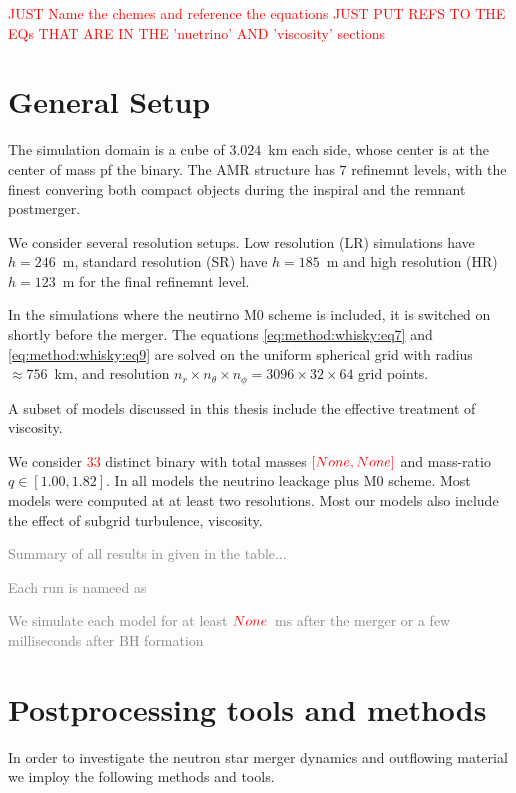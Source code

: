 \documentclass[11pt,a4paper,headinclude=true,DIV=14,BCOR=8mm,chapterprefix,listof=totoc,twoside,openright,abstracton]{scrbook}
\newcommand{\red}[1]{\textcolor{red}{#1}}
\newcommand{\gray}[1]{\textcolor{gray}{#1}}
\begin{document}
\red{JUST Name the chemes and reference the equations}
\red{JUST PUT REFS TO THE EQs THAT ARE IN THE 'nuetrino' AND 'viscosity' sections}


\section{General Setup}



The simulation domain is a cube of $3.024$~km each side, whose center is at the center of mass pf the binary.
The AMR structure has $7$ refinemnt levels, with the finest convering both compact objects during the inspiral and the remnant postmerger.

We consider several resolution setups. Low resolution (LR) simulations have $h=246$~m, standard resolution (SR) 
have $h=185$~m and high resolution (HR) $h=123$~m for the final refinemnt level.

In the simulations where the neutirno M0 scheme is included, it is switched on shortly before the merger. 
The equations \eqref{eq:method:whisky:eq7} and \eqref{eq:method:whisky:eq9} are solved on the uniform spherical grid
with radius $\approx 756$~km, and resolution $n_r\times n_{\theta}\times n_{\phi} = 3096 \times 32 \times 64$
grid points.

A subset of models discussed in this thesis include the effective treatment of viscosity. 

We consider \red{$33$} distinct binary with total masses $\red{[None,None]}$ and mass-ratio $q\in[1.00,1.82]$.
In all models the neutrino leackage plus M0 scheme. Most models were computed at at least two resolutions. 
Most our models also include the effect of subgrid turbulence, viscosity.

\gray{Summary of all results in given in the table...}

\gray{Each run is nameed as}

\gray{We simulate each model for at least $\red{None}$~ms after the merger or a few milliseconds after BH formation}



\section{Postprocessing tools and methods}


In order to investigate the neutron star merger dynamics and outflowing material we imploy the following methods and tools.
\end{document}
